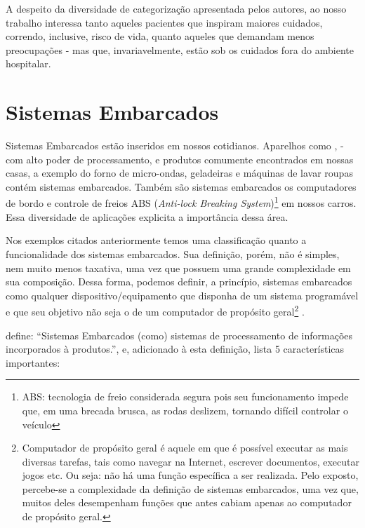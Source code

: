 A despeito da diversidade de categorização apresentada pelos autores, ao nosso
trabalho interessa tanto aqueles pacientes que inspiram maiores cuidados,
correndo, inclusive, risco de vida, quanto aqueles que demandam menos
preocupações - mas que, invariavelmente, estão sob os cuidados fora do
ambiente hospitalar.

\section{Sistemas Embarcados}\label{sec:sistemas-embarcados}

Sistemas Embarcados estão inseridos em nossos cotidianos. Aparelhos como
\smartphones[], \tablets[] - com alto poder de processamento, e
produtos comumente encontrados em nossas casas, a exemplo do forno de 
micro-ondas, geladeiras e máquinas de lavar roupas contém sistemas embarcados. 
Também são sistemas embarcados os computadores de bordo e
controle de freios ABS (\textit{Anti-lock Breaking System})\footnote{ABS:
tecnologia  de freio considerada segura pois seu funcionamento impede que, em
uma brecada brusca, as rodas  deslizem, tornando difícil controlar o veículo} em
nossos carros. Essa diversidade de aplicações explicita a importância dessa área.

Nos exemplos citados anteriormente temos uma classificação quanto a 
funcionalidade dos sistemas embarcados. Sua definição, porém, não é simples, nem muito menos taxativa,
uma vez que possuem uma grande complexidade em sua composição. Dessa forma,
podemos definir, a princípio, sistemas embarcados como qualquer
dispositivo/equipamento que disponha de um sistema programável e que seu
objetivo não seja o de um computador de propósito geral\footnote{Computador de
propósito geral é aquele em que é possível executar as mais diversas tarefas,
tais como navegar na Internet, escrever documentos, executar jogos etc. Ou
seja: não há uma função específica a ser realizada. Pelo exposto, percebe-se a
complexidade da definição de sistemas embarcados, uma vez que, muitos deles
desempenham funções que antes cabiam apenas ao computador de propósito geral.}
\cite{wolf2012computers}.

 define: ``Sistemas Embarcados (como) sistemas
de processamento de informações incorporados à produtos.'', e, adicionado à
esta definição, lista 5 características importantes: 

